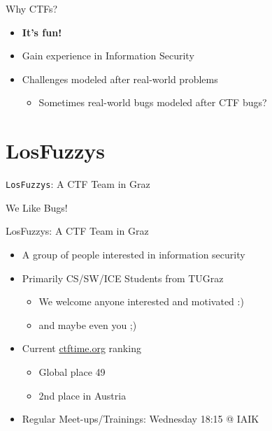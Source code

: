 \begin{frame}
  {Why CTFs?}

  \begin{itemize}
    \item \textbf{It's fun!}
    \item Gain experience in Information Security
    \item Challenges modeled after real-world problems
      \begin{itemize}
        \item Sometimes real-world bugs modeled after CTF bugs?
      \end{itemize}
  \end{itemize}
\end{frame}

\section{LosFuzzys}

{
\begin{frame}

  {\huge
    \texttt{LosFuzzys}: A CTF Team in Graz}

  \vspace{19em}

  {\Large
  We Like Bugs!}

\end{frame}
}

\begin{frame}
  {LosFuzzys: A CTF Team in Graz}

  \begin{itemize}
    \item A group of people interested in information security
    \item Primarily CS/SW/ICE Students from TUGraz
      \begin{itemize}
        \item We welcome anyone interested and motivated :)
        \item and maybe even you ;)
      \end{itemize}
    \item Current \href{https://ctftime.org/team/8323}{ctftime.org} ranking
      \begin{itemize}
        \item Global place 49
        \item 2nd place in Austria
      \end{itemize}
    \item Regular Meet-ups/Trainings: Wednesday 18:15 @ IAIK
  \end{itemize}
\end{frame}


